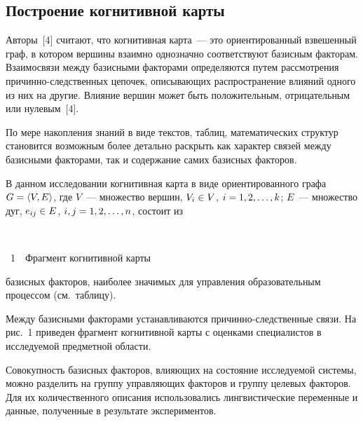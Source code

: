 \begin{multicols}{2}
    
     \subsection{Построение когнитивной карты}
     
Авторы~[4] считают, что 
когнитивная карта~--- это ориентированный взвешенный граф, в котором 
вершины взаимно однозначно соответствуют базисным факторам. 
Взаимосвязи между базисными факторами определяются путем 
рассмотрения при\-чин\-но-след\-ст\-вен\-ных цепочек, описывающих 
распространение влияний одного из них на другие. Влияние вершин может 
быть положительным, отрицательным или нулевым~[4]. 
     
     По мере накопления знаний в виде текстов, таб\-лиц, математических 
структур становится возможным более детально раскрыть как характер 
связей между базисными факторами, так и содержание самих базисных 
факторов.   
     
     В данном исследовании когнитивная карта в виде ориентированного 
графа $G\hm= \langle V, E\rangle$, где $V$~--- множество вершин, 
$V_i\hm\in V$, $i \hm= 1, 2,\ldots , k$; $E$~--- множество дуг, $e_{ij}\hm\in E$, $i, j 
\hm= 1, 2, \ldots , n$, состоит из\linebreak
     
\vspace*{6pt}

\noindent
\begin{center}  %
 \mbox{%
 \epsfxsize=77.519mm
 }
  \end{center}
\begin{center}
{{\figurename~1}\ \ \small{Фрагмент когнитивной карты}}
\end{center}


      

\addtocounter{figure}{1}

\noindent
 базисных факторов, наиболее значимых для 
управ\-ле\-ния образовательным процессом (см.\ таблицу). 


     Между базисными факторами устанавливаются при\-чин\-но-след\-ст\-вен\-ные связи. 
     На рис.~1 приведен фрагмент когнитивной карты с 
оценками специалистов в исследуемой предметной области.
     

     
     Совокупность базисных факторов, влияющих на состояние 
исследуемой системы, можно разделить на группу управляющих факторов и 
группу целевых факторов. Для их количественного описания использовались 
лингвистические переменные и данные, полученные в результате 
экспериментов.



\end{multicols}
